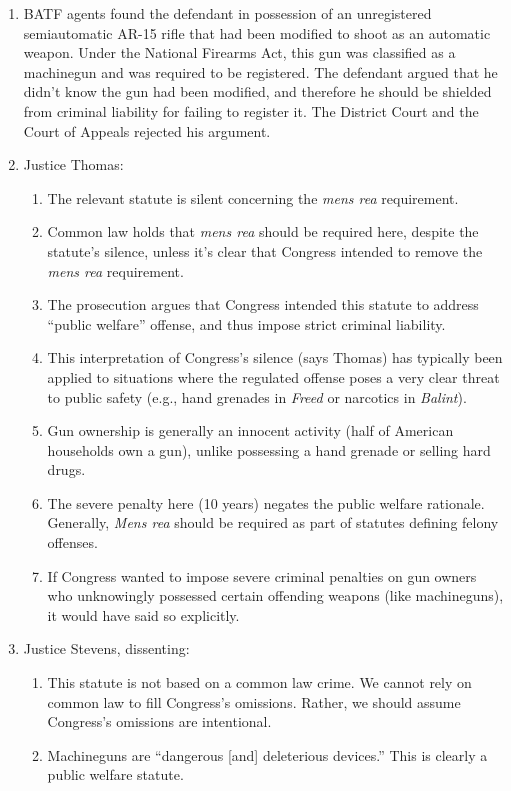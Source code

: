 \begin{enumerate}
    \item BATF agents found the defendant in possession of an unregistered semiautomatic AR-15 rifle that had been modified to shoot as an automatic weapon. Under the National Firearms Act, this gun was classified as a machinegun and was required to be registered. The defendant argued that he didn't know the gun had been modified, and therefore he should be shielded from criminal liability for failing to register it. The District Court and the Court of Appeals rejected his argument.
    \item Justice Thomas:
    \begin{enumerate}
        \item The relevant statute is silent concerning the \emph{mens rea} requirement.
        \item Common law holds that \emph{mens rea} should be required here, despite the statute's silence, unless it's clear that Congress intended to remove the \emph{mens rea} requirement.
        \item The prosecution argues that Congress intended this statute to address ``public welfare'' offense, and thus impose strict criminal liability.
        \item This interpretation of Congress's silence (says Thomas) has typically been applied to situations where the regulated offense poses a very clear threat to public safety (e.g., hand grenades in \emph{Freed} or narcotics in \emph{Balint}). 
        \item Gun ownership is generally an innocent activity (half of American households own a gun), unlike possessing a hand grenade or selling hard drugs.
        \item The severe penalty here (10 years) negates the public welfare rationale. Generally, \emph{Mens rea} should be required as part of statutes defining felony offenses.
        \item If Congress wanted to impose severe criminal penalties on gun owners who unknowingly possessed certain offending weapons (like machineguns), it would have said so explicitly.
    \end{enumerate}
    \item Justice Stevens, dissenting:
    \begin{enumerate}
        \item This statute is not based on a common law crime. We cannot rely on common law to fill Congress's omissions. Rather, we should assume Congress's omissions are intentional.
        \item Machineguns are ``dangerous [and] deleterious devices.'' This is clearly a public welfare statute.
    \end{enumerate}
\end{enumerate}

